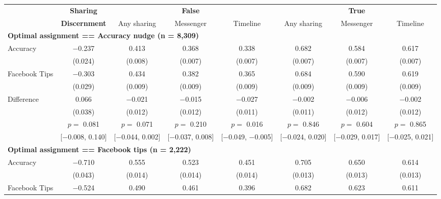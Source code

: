 
\begin{tabular}[t]{lccccccc}
 & \textbf{Sharing} &  & \textbf{False} &  &  & \textbf{True} & \\
 & \textbf{Discernment} & Any sharing & Messenger & Timeline & Any sharing & Messenger & Timeline\\\cmidrule(lr){2-2} \cmidrule(lr){3-5} \cmidrule(lr){6-8} \multicolumn{4}{l}{\textbf{Optimal assignment == Accuracy nudge (n = 8,309)}} \rule{0pt}{1.2\normalbaselineskip}\\
\hspace{1em}Accuracy & \num{-0.237} & \num{0.413} & \num{0.368} & \num{0.338} & \num{0.682} & \num{0.584} & \num{0.617}\\
 & (\num{0.024}) & (\num{0.008}) & (\num{0.007}) & (\num{0.007}) & (\num{0.007}) & (\num{0.007}) & (\num{0.007})\\
\hspace{1em}Facebook Tips & \num{-0.303} & \num{0.434} & \num{0.382} & \num{0.365} & \num{0.684} & \num{0.590} & \num{0.619}\\
 & (\num{0.029}) & (\num{0.009}) & (\num{0.009}) & (\num{0.009}) & (\num{0.009}) & (\num{0.009}) & (\num{0.009})\\
\cmidrule(lr){2-8}
\hspace{1em}Difference & \num{0.066} & \num{-0.021} & \num{-0.015} & \num{-0.027} & \num{-0.002} & \num{-0.006} & \num{-0.002}\\
 & (\num{0.038}) & (\num{0.012}) & (\num{0.012}) & (\num{0.011}) & (\num{0.011}) & (\num{0.012}) & (\num{0.012})\\
 & $p =$ \num{0.081} & $p =$ \num{0.071} & $p =$ \num{0.210} & $p =$ \num{0.016} & $p =$ \num{0.846} & $p =$ \num{0.604} & $p =$ \num{0.865}\\
 & {}[\num{-0.008}, \num{0.140}] & {}[\num{-0.044}, \num{0.002}] & {}[\num{-0.037}, \num{0.008}] & {}[\num{-0.049}, \num{-0.005}] & {}[\num{-0.024}, \num{0.020}] & {}[\num{-0.029}, \num{0.017}] & {}[\num{-0.025}, \num{0.021}]\\\multicolumn{4}{l}{\textbf{Optimal assignment == Facebook tips (n = 2,222)}} \rule{0pt}{1.2\normalbaselineskip}\\
\hspace{1em} Accuracy & \num{-0.710} & \num{0.555} & \num{0.523} & \num{0.451} & \num{0.705} & \num{0.650} & \num{0.614}\\
 & (\num{0.043}) & (\num{0.014}) & (\num{0.014}) & (\num{0.014}) & (\num{0.013}) & (\num{0.013}) & (\num{0.013})\\
\hspace{1em} Facebook Tips & \num{-0.524} & \num{0.490} & \num{0.461} & \num{0.396} & \num{0.682} & \num{0.623} & \num{0.611}\\

\end{tabular}

